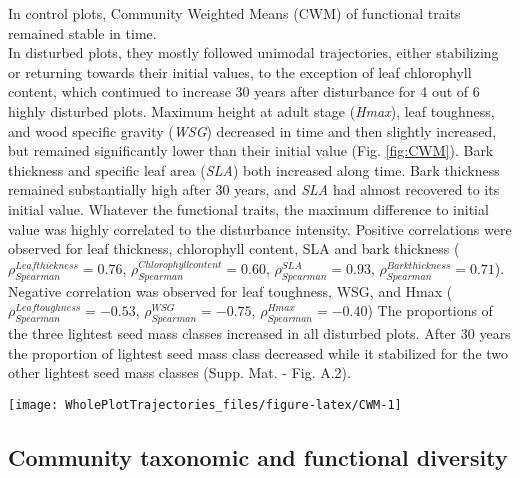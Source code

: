 \documentclass[fleqn,10pt]{ArtEcoFoG} %
\theoremstyle{definition}
\theoremstyle{definition}
\theoremstyle{definition}
\theoremstyle{remark}
\begin{document}
In control plots, Community Weighted Means (CWM) of functional traits
remained stable in time.\\
In disturbed plots, they mostly followed unimodal trajectories, either
stabilizing or returning towards their initial values, to the exception
of leaf chlorophyll content, which continued to increase 30 years after
disturbance for 4 out of 6 highly disturbed plots. Maximum height at
adult stage (\emph{Hmax}), leaf toughness, and wood specific gravity
(\emph{WSG}) decreased in time and then slightly increased, but remained
significantly lower than their initial value (Fig. \ref{fig:CWM}). Bark
thickness and specific leaf area (\emph{SLA}) both increased along time.
Bark thickness remained substantially high after 30 years, and
\emph{SLA} had almost recovered to its initial value. Whatever the
functional traits, the maximum difference to initial value was highly
correlated to the disturbance intensity. Positive correlations were
observed for leaf thickness, chlorophyll content, SLA and bark thickness
(\(\rho_{Spearman}^{Leaf thickness}=0.76\),
\(\rho_{Spearman}^{Chlorophyll content}=0.60\),
\(\rho_{Spearman}^{SLA}=0.93\),
\(\rho_{Spearman}^{Bark thickness}=0.71\)). Negative correlation was
observed for leaf toughness, WSG, and Hmax
(\(\rho_{Spearman}^{Leaf toughness}=-0.53\),
\(\rho_{Spearman}^{WSG}=-0.75\), \(\rho_{Spearman}^{Hmax}=-0.40\)) The
proportions of the three lightest seed mass classes increased in all
disturbed plots. After 30 years the proportion of lightest seed mass
class decreased while it stabilized for the two other lightest seed mass
classes (Supp. Mat. - Fig. A.2).

\begin{figure*}

{\centering \texttt{[image: WholePlotTrajectories\_files/figure-latex/CWM-1]} 

}

\caption{Trajectories of community weighted means over 30 years after disturbance of four leaf traits (leaf thickness, chlorophyll content, toughness, and specific area), two stem traits (wood specific gravity and bark thickness), and one life history trait (species maximum height at adult stage). }\label{fig:CWM}
\end{figure*}

\subsection{Community taxonomic and functional
diversity}\label{community-taxonomic-and-functional-diversity}
\end{document}
